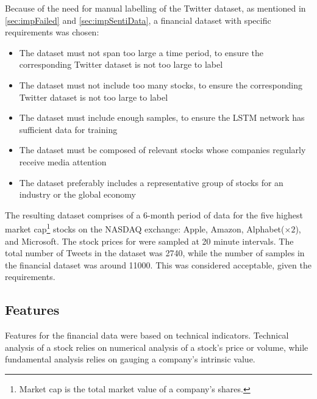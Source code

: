 \documentclass[12pt,a4paper,twoside,openright]{report}
\begin{document}
Because of the need for manual labelling of the Twitter dataset, as mentioned in \cref{sec:impFailed} and 
\cref{sec:impSentiData}, a financial dataset with specific requirements was chosen:

\begin{itemize}
\item
The dataset must not span too large a time period, to ensure the corresponding Twitter dataset is not too large to label

\item
The dataset must not include too many stocks, to ensure the corresponding Twitter dataset is not too large to label

\item
The dataset must include enough samples, to ensure the LSTM network has sufficient data for training

\item
The dataset must be composed of relevant stocks whose companies regularly receive media attention

\item
The dataset preferably includes a representative group of stocks for an industry or the global economy

\end{itemize}

The resulting dataset comprises of a 6-month period of data for the five highest market cap\footnote{Market cap
is the total market value of a company's shares.} stocks on the
NASDAQ exchange: Apple, Amazon, Alphabet\footnotemark ($\times2$), and Microsoft. The stock prices for
were sampled at 20 minute intervals. The total number of Tweets
in the dataset was 2740, while the number of samples in the financial
dataset was around 11000. This was considered acceptable, given the requirements.


\subsection{Features}
\label{sec:impFinFeat}

Features for the financial data were based on technical indicators. Technical analysis
of a stock relies on numerical analysis of a stock's price or volume, while fundamental
analysis relies on gauging a company's intrinsic value. 
\end{document}
